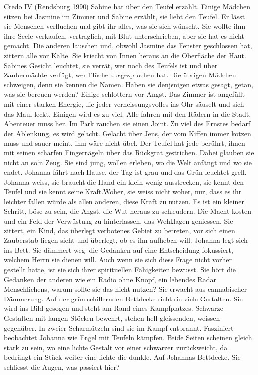 Credo IV (Rendsburg 1990)
Sabine hat über den Teufel erzählt. Einige Mädchen sitzen bei Jasmine im Zimmer und Sabine erzählt, sie liebt den Teufel. Er lässt sie Menschen verfluchen und gibt ihr alles, was sie sich wünscht. Sie wollte ihm ihre Seele verkaufen, vertraglich, mit Blut unterschrieben, aber sie hat es nicht gemacht. Die anderen lauschen und, obwohl Jasmine das Fenster geschlossen hat, zittern alle vor Kälte. Sie kriecht von Innen heraus an die Oberfläche der Haut. Sabines Gesicht leuchtet, sie verrät, wer noch des Teufels ist und über Zaubermächte verfügt, wer Flüche ausgesprochen hat. Die übrigen Mädchen schweigen, denn sie kennen die Namen. Haben sie denjenigen etwas gesagt, getan,  was sie bereuen werden? Einige schlottern vor Angst. Das Zimmer ist angefüllt mit einer starken Energie, die jeder verheissungsvolles ins Ohr säuselt und sich das Maul leckt.
Einigen wird es zu viel. Alle fahren mit den Rädern in die Stadt, Abenteuer muss her. Im Park rauchen sie einen Joint. Zu viel des Ernstes bedarf der Ablenkung, es wird gelacht. Gelacht über Jens, der vom Kiffen immer kotzen muss und sauer meint, ihm wäre nicht übel.
Der Teufel hat jede berührt, ihnen mit seinen scharfen Fingernägeln über das Rückgrat gestrichen. Dabei glauben sie nicht an so`n Zeug. Sie sind jung, wollen erleben, wo die Welt anfängt und wo sie endet.
Johanna fährt nach Hause, der Tag ist grau und das Grün leuchtet grell. Johanna weiss, sie braucht die Hand ein klein wenig ausstrecken, sie kennt den Teufel und sie kennt seine Kraft.Woher, sie weiss nicht woher, nur, dass es ihr leichter fallen würde als allen anderen, diese Kraft zu nutzen. Es ist ein kleiner Schritt, böse zu sein, die Angst, die Wut heraus zu schleudern. Die Macht kosten und ein Feld der Verwüstung zu hinterlassen, das Wehklagen geniessen. Sie zittert, ein Kind, das überlegt verbotenes Gebiet zu betreten, vor sich einen Zauberstab liegen sieht und überlegt, ob es ihn aufheben will.
Johanna legt sich ins Bett. Sie dämmert weg, die Gedanken auf eine Entscheidung fokussiert, welchem Herrn sie dienen will. Auch wenn sie sich diese Frage nicht vorher gestellt hatte, ist sie sich ihrer spirituellen Fähigkeiten bewusst.
Sie hört die Gedanken der anderen wie ein Radio ohne Knopf, ein lebendes Radar Menschlichens, warum sollte sie das nicht nutzen?
Sie erwacht aus cannabischer Dämmerung. Auf der grün schillernden Bettdecke sieht sie viele Gestalten. Sie wird ins Bild gesogen und steht am Rand eines Kampfplatzes. Schwarze Gestalten mit langen Stöcken bewehrt, stehen hell gleissenden, weissen gegenüber. In zweier Scharmützeln sind sie im Kampf entbrannt. Fasziniert beobachtet Johanna wie Engel mit Teufeln kämpfen. Beide Seiten scheinen gleich stark zu sein, wo eine lichte Gestalt vor einer schwarzen zurückweicht, da bedrängt ein Stück weiter eine lichte die dunkle. Auf Johannas Bettdecke. Sie schliesst die Augen, was passiert hier? 
